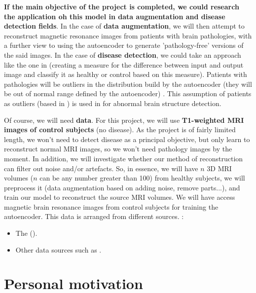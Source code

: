 \textbf{If the main objective of the project is completed, we could research the application oh this model in data augmentation and disease detection fields}. In the case of \textbf{data augmentation}, we will then attempt to reconstruct magnetic resonance images from patients with brain pathologies, with a further view to using the autoencoder to generate 'pathology-free' versions of the said images. In the case of \textbf{disease detection}, we could take an approach like the one in \cite{pinaya2019} (creating a measure for the difference between input and output image and classify it as healthy or control based on this measure). Patients with pathologies will be outliers in the distribution build by the autoencoder (they will be out of normal range defined by the autoencoder) \cite{marquand2016normative} \cite{mourao2011outlier}. This assumption of patients as outliers (based in \cite{mourao2011outlier}) is used in \cite{pinaya2019} for abnormal brain structure detection.

Of course, we will need \textbf{data}. For this project, we will use \textbf{T1-weighted MRI images of control subjects} (no disease). As the project is of fairly limited length, we won't need to detect disease as a principal objective, but only learn to reconstruct normal MRI images, so we won't need pathology images by the moment. In addition, we will investigate whether our method of reconstruction can filter out noise and/or artefacts. So, in essence, we will have $n$ 3D MRI volumes ($n$ can be any number greater than 100) from healthy subjects, we will preprocess it (data augmentation based on adding noise, remove parts...), and train our model to reconstruct the source MRI volumes. We will have access magnetic brain resonance images from control subjects for training the autoencoder. This data is arranged from different sources. :

\begin{itemize}
    \item The  ().
    \item Other data sources such as .
\end{itemize}



\section{Personal motivation}

